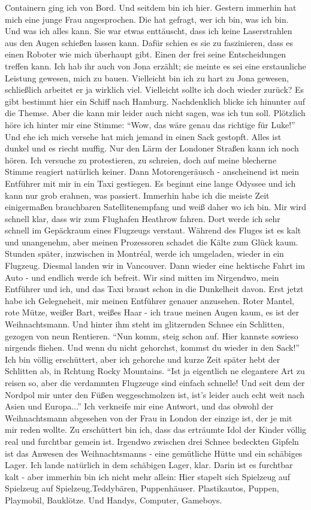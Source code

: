 Containern ging ich von Bord. Und seitdem bin ich hier. Gestern immerhin hat mich eine junge Frau angesprochen. Die hat gefragt, wer ich bin, was ich bin. Und was ich alles kann. Sie war etwas enttäuscht, dass ich keine Laserstrahlen aus den Augen schießen lassen kann. Dafür schien es sie zu faszinieren, dass es einen Roboter wie mich überhaupt gibt. Einen der frei seine Entscheidungen treffen kann. Ich hab ihr auch von Jona erzählt; sie meinte es sei eine erstaunliche Leistung gewesen, mich zu bauen. Vielleicht bin ich zu hart zu Jona gewesen, schließlich arbeitet er ja wirklich viel. Vielleicht sollte ich doch wieder zurück? Es gibt bestimmt hier ein Schiff nach Hamburg. Nachdenklich blicke ich hinunter auf die Themse. Aber die kann mir leider auch nicht sagen, was ich tun soll. Plötzlich höre ich hinter mir eine Stimme: "`Wow, das wäre genau das richtige für Luke!"' Und ehe ich mich versehe hat mich jemand in einen Sack gestopft. Alles ist dunkel und es riecht muffig. Nur den Lärm der Londoner Straßen kann ich noch hören. Ich versuche zu protestieren, zu schreien, doch auf meine blecherne Stimme reagiert natürlich keiner. Dann Motorengeräusch - anscheinend ist mein Entführer mit mir in ein Taxi gestiegen. Es beginnt eine lange Odyssee und ich kann nur grob erahnen, was passiert. Immerhin habe ich die meiste Zeit einigermaßen brauchbaren Satellitenempfang und weiß daher wo ich bin. Mir wird schnell klar, dass wir zum Flughafen Heathrow fahren. Dort werde ich sehr schnell im Gepäckraum eines Flugzeugs verstaut. Während des Fluges ist es kalt und unangenehm, aber meinen Prozessoren schadet die Kälte zum Glück kaum. Stunden später, inzwischen in Montréal, werde ich umgeladen, wieder in ein Flugzeug. Diesmal landen wir in Vancouver. Dann wieder eine hektische Fahrt im Auto - und endlich werde ich befreit. Wir sind mitten im Nirgendwo, mein Entführer und ich, und das Taxi braust schon in die Dunkelheit davon. Erst jetzt habe ich Gelegneheit, mir meinen Entführer genauer anzusehen. Roter Mantel, rote Mütze, weißer Bart, weißes Haar - ich traue meinen Augen kaum, es ist der Weihnachtsmann. Und hinter ihm steht im glitzernden Schnee ein Schlitten, gezogen von neun Rentieren. "`Nun komm, steig schon auf. Hier kannste sowieso nirgends fliehen. Und wenn du nicht gehorchst, kommst du wieder in den Sack!"' Ich bin völlig erschüttert, aber ich gehorche und kurze Zeit später hebt der Schlitten ab, in Rchtung Rocky Mountains. "`Ist ja eigentlich ne elegantere Art zu reisen so, aber die verdammten Flugzeuge sind einfach schnelle! Und seit dem der Nordpol mir unter den Füßen weggeschmolzen ist, ist's leider auch echt weit nach Asien und Europa..."' Ich verkneife mir eine Antwort, und das obwohl der Weihnachtsmann abgesehen von der Frau in London der einzige ist, der je mit mir reden wollte. Zu erschüttert bin ich, dass das erträumte Idol der Kinder völlig real und furchtbar gemein ist. Irgendwo zwischen drei Schnee bedeckten Gipfeln ist das Anwesen des Weihnachtsmanns - eine gemütliche Hütte und ein schäbiges Lager. Ich lande natürlich in dem schäbigen Lager, klar. Darin ist es furchtbar kalt - aber immerhin bin ich nicht mehr allein: Hier stapelt sich Spielzeug auf Spielzeug auf Spielzeug.Teddybären, Puppenhäuser. Plastikautos, Puppen, Playmobil, Bauklötze. Und Handys, Computer, Gameboys. 